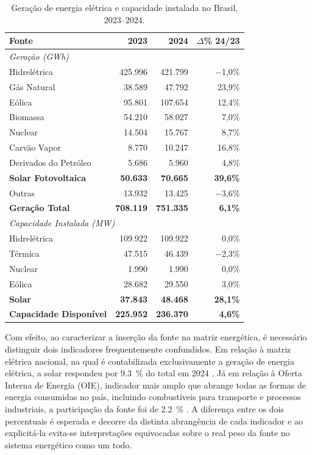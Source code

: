 \begin{table}[!h]
    \centering
    \caption{Geração de energia elétrica e capacidade instalada no Brasil, 2023--2024.}
\label{tab:matriz_energetica}
\begin{tabular}{lrrr}
\hline
\textbf{Fonte} & \textbf{2023} & \textbf{2024} & \textbf{$\Delta$\% 24/23} \\
\hline
\multicolumn{4}{l}{\textit{Geração (GWh)}} \\
\hline
Hidrelétrica          & 425.996 & 421.799 & $-$1,0\% \\
Gás Natural           &  38.589 &  47.792 & 23,9\%   \\
Eólica                &  95.801 & 107.654 & 12,4\%   \\
Biomassa              &  54.210 &  58.027 &  7,0\%   \\
Nuclear               &  14.504 &  15.767 &  8,7\%   \\
Carvão Vapor          &   8.770 &  10.247 & 16,8\%   \\
Derivados do Petróleo &   5.686 &   5.960 &  4,8\%   \\
\textbf{Solar Fotovoltaica} & \textbf{50.633} & \textbf{70.665} & \textbf{39,6\%} \\
Outras                &  13.932 &  13.425 & $-$3,6\% \\
\textbf{Geração Total}& \textbf{708.119} & \textbf{751.335} & \textbf{6,1\%} \\
\hline
\multicolumn{4}{l}{\textit{Capacidade Instalada (MW)}} \\
\hline
Hidrelétrica          & 109.922 & 109.922 &  0,0\%   \\
Térmica               &  47.515 &  46.439 & $-$2,3\% \\
Nuclear               &   1.990 &   1.990 &  0,0\%   \\
Eólica                &  28.682 &  29.550 &  3,0\%   \\
\textbf{Solar}        & \textbf{37.843} & \textbf{48.468} & \textbf{28,1\%} \\
\textbf{Capacidade Disponível} & \textbf{225.952} & \textbf{236.370} & \textbf{4,6\%} \\
\hline
\end{tabular}

\end{table}

Com efeito, ao caracterizar a inserção da fonte na matriz energética, é necessário distinguir
dois indicadores frequentemente confundidos. Em relação à matriz elétrica
nacional, na qual é contabilizada exclusivamente a geração de energia elétrica, a
solar respondeu por \SI{9,3}{\percent} do total em 2024 \cite{EPE2025}. Já em
relação à Oferta Interna de Energia (OIE), indicador mais amplo que abrange todas
as formas de energia consumidas no país, incluindo combustíveis para transporte e
processos industriais, a participação da fonte foi de \SI{2,2}{\percent}
\cite{EPE2025}. A diferença entre os dois percentuais é esperada e decorre da distinta abrangência de cada indicador e ao explicitá-la evita-se interpretações equivocadas sobre o real peso da fonte no sistema energético como um todo.

